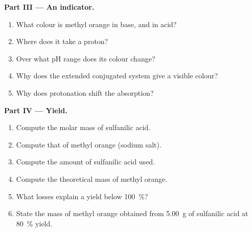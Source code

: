 \begin{problem}
\medskip
\noindent\textbf{Part III --- An indicator.}
\begin{enumerate}[resume]
  \item What colour is methyl orange in base, and in acid?
  \item Where does it take a proton?
  \item Over what pH range does its colour change?
  \item Why does the extended conjugated system give a visible colour?
  \item Why does protonation shift the absorption?
\end{enumerate}

\medskip
\noindent\textbf{Part IV --- Yield.}
\begin{enumerate}[resume]
  \item Compute the molar mass of sulfanilic acid.
  \item Compute that of methyl orange (sodium salt).
  \item Compute the amount of sulfanilic acid used.
  \item Compute the theoretical mass of methyl orange.
  \item What losses explain a yield below 100~\%?
  \item State the mass of methyl orange obtained from \qty{5.00}{g} of sulfanilic acid at 80~\%
        yield.
\end{enumerate}
\end{problem}
